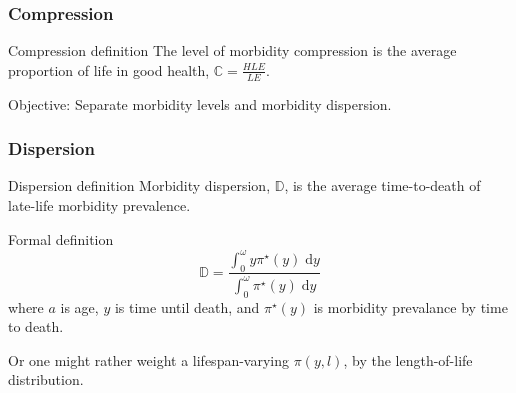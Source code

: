 \documentclass[20pt]{beamer}
\newcommand{\dd}{\; \mathrm{d}}
\begin{document}
\begin{frame}
\frametitle{Compression}
\begin{block}{Compression definition}
The level of morbidity compression is the average proportion of life in good
health, $\mathbb{C} = \frac{HLE}{LE}$.
\end{block}


\pause
\begin{block}{Objective:}
Separate morbidity levels and morbidity dispersion.
\end{block}
\end{frame}

\begin{frame}
\frametitle{Dispersion}
\begin{block}{Dispersion definition}
Morbidity dispersion, $\mathbb{D}$, is the average time-to-death of late-life
morbidity prevalence.
\end{block}
\pause

\begin{block}{Formal definition}
\begin{equation}
\mathbb{D} = \frac{\int_0^{\omega} y \pi^\star(y) \dd
y}{\int_0^{\omega}\pi^\star(y)\dd y}
\end{equation}
where $a$ is age, $y$ is time until death, and $\pi^\star(y)$ is morbidity
prevalance by time to death.
\end{block}

\pause
Or one might rather weight a lifespan-varying $\pi(y,l)$, by the length-of-life
distribution.

\end{frame}
\end{document}
